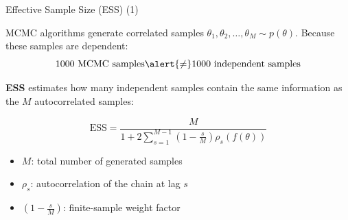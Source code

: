 \documentclass[aspectratio=43]{beamer}
\begin{document}


\begin{frame}{Effective Sample Size (ESS) (1)}
	
	MCMC algorithms generate correlated samples $\theta_1, \theta_2, \dots, \theta_M \sim p(\theta)$. Because these samples are dependent:
	\[
	1000 \text{ MCMC samples} \alert{\neq} 1000 \text{ independent samples}
	\]
	
	\vspace{0.5em}
	
	\textbf{ESS} estimates how many \alert{independent samples} contain the same information as the $M$ autocorrelated samples:
	
	\[
	\text{ESS} = \frac{M}{1 + 2 \sum_{s=1}^{M-1} \left(1 - \frac{s}{M}\right) \rho_s (f(\theta))}
	\]
	
	\vspace{0.5em}
	
	{\small
		\begin{itemize}
			\item $M$: total number of generated samples
			\item $\rho_s$: autocorrelation of the chain at lag $s$
			\item $\left(1 - \frac{s}{M}\right)$: finite-sample weight factor
		\end{itemize}
	}
	
\end{frame}
\end{document}
